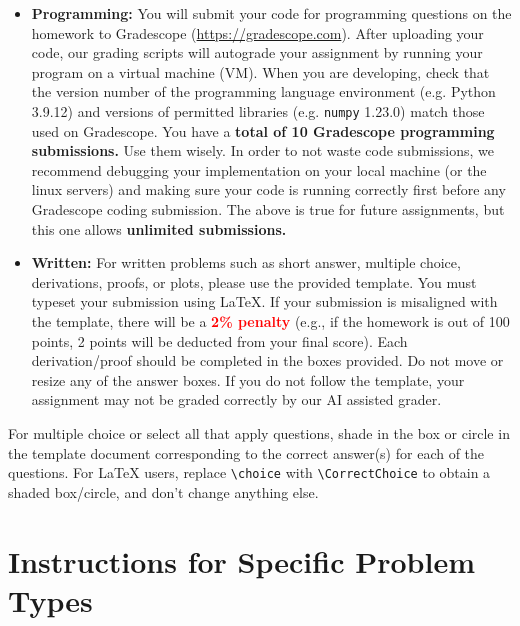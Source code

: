 \documentclass[11pt,addpoints,answers]{exam}
\begin{document}
\begin{itemize}
\begin{itemize}
\item \textbf{Programming:} You will submit your code for programming questions on the homework to Gradescope (\url{https://gradescope.com}). After uploading your code, our grading scripts will autograde your assignment by running your program on a virtual machine (VM). When you are developing, check that the version number of the programming language environment (e.g. Python 3.9.12) and versions of permitted libraries (e.g.  \texttt{numpy} 1.23.0) match those used on Gradescope. You have a \textbf{total of 10 Gradescope programming submissions.} Use them wisely. In order to not waste code submissions, we recommend debugging your implementation on your local machine (or the linux servers) and making sure your code is running correctly first before any Gradescope coding submission. {\color{red} The above is true for future assignments, but this one allows \textbf{unlimited submissions.}}

\item \textbf{Written:} For written problems such as short answer, multiple choice, derivations, proofs, or plots, please use the provided template. You must typeset your submission using \LaTeX{}. If your submission is misaligned with the template, there will be a \textbf{\textcolor{red}{2\% penalty}} (e.g., if the homework is out of 100 points, 2 points will be deducted from your final score). Each derivation/proof should be completed in the boxes provided. Do not move or resize any of the answer boxes. If you do not follow the template, your assignment may not be graded correctly by our AI assisted grader.

\end{itemize}

\end{itemize}


For multiple choice or select all that apply questions, shade in the box or circle in the template document corresponding to the correct answer(s) for each of the questions. For \LaTeX{} users, replace \lstinline{\choice} with \lstinline{\CorrectChoice} to obtain a shaded box/circle, and don't change anything else.\clearpage

\section*{Instructions for Specific Problem Types}
\end{document}
